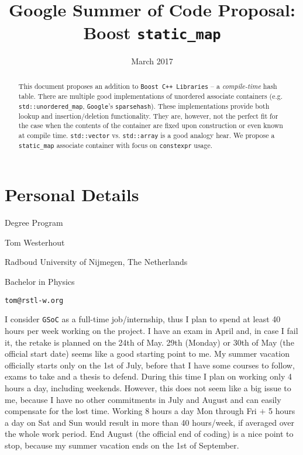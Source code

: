 \documentclass[a4paper,12pt]{article}
\title{Google Summer of Code Proposal: Boost \texttt{static\_map}}
\date{March 2017}
\begin{document}
\maketitle

\begin{abstract}
    This document proposes an addition to \texttt{Boost C++ Libraries} -- a \textit{compile-time} hash table. There are multiple good implementations of unordered associate containers (e.g. \texttt{std::unordered\_map}, \texttt{Google}'s \texttt{sparsehash}). These implementations provide both lookup and insertion/deletion functionality. They are, however, not the perfect fit for the case when the contents of the container are fixed upon construction or even known at compile time. \texttt{std::vector} vs. \texttt{std::array} is a good analogy hear. We propose a \texttt{static\_map} associate container with focus on \texttt{constexpr} usage.
\end{abstract}

\section{Personal Details}
    \begin{labeling}{Degree Program}
    \item [Name] Tom Westerhout
    \item [University] Radboud University of Nijmegen, The Netherlands
    \item [Degree Program] Bachelor in Physics
    \item [Email] \texttt{tom@rstl-w.org}
    \item [Availability] I consider \texttt{GSoC} as a full-time job/internship, thus I plan to spend at least 40 hours per week working on the project. I have an exam in April and, in case I fail it, the retake is planned on the 24th of May. 29th (Monday) or 30th of May (the official start date) seems like a good starting point to me. My summer vacation officially starts only on the 1st of July, before that I have some courses to follow, exams to take and a thesis to defend. During this time I plan on working only 4 hours a day, including weekends. However, this does not seem like a big issue to me, because I have no other commitments in July and August and can easily compensate for the lost time. Working 8 hours a day Mon through Fri $+$ 5 hours a day on Sat and Sun would result in more than 40 hours/week, if averaged over the whole work period. End August (the official end of coding) is a nice point to stop, because my summer vacation ends on the 1st of September.
    \end{labeling}
\end{document}
